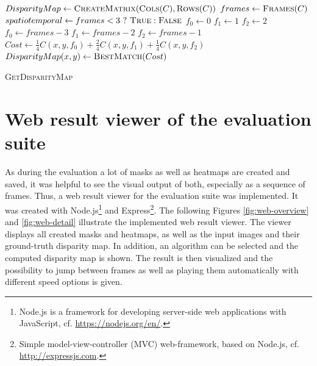 \begin{algorithm}[h!]
\DontPrintSemicolon
{}
$DisparityMap \gets \textsc{CreateMatrix}(\textsc{Cols}(C),\textsc{Rows}(C))$\;
$frames \gets \textsc{Frames}(C)$\;
$spatiotemporal \gets frames < 3\ ?\ \textsc{True} : \textsc{False}$\;
 {
   {
     {
       {
         {
          $f_{0} \gets 0$\;
          $f_{1} \gets 1$\;
          $f_{2} \gets 2$\;
        }
         {
          $f_{0} \gets frames - 3$\;
          $f_{1} \gets frames - 2$\;
          $f_{2} \gets frames - 1$\;
        }
         {
          $Cost \gets \frac{1}{4} C(x,y,f_0) + \frac{2}{4} C(x,y,f_1)+ \frac{1}{4} C(x,y,f_2)$\;
        }
        $DisparityMap(x,y) \gets \textsc{BestMatch}(Cost)$\;
      }
    }
  }
}
\;
\caption{\textsc{GetDisparityMap}}
\label{alg:disparity-map}
\end{algorithm}

\newpage

\section{Web result viewer of the evaluation suite}

As during the evaluation a lot of masks as well as heatmaps are created and saved, it was helpful to see the visual output of both, especially as a sequence of frames.
Thus, a web result viewer for the evaluation suite was implemented.
It was created with Node.js\footnote{Node.js is a framework for developing server-side web applications with JavaScript, cf. \url{https://nodejs.org/en/}.} and Express\footnote{Simple model-view-controller (MVC) web-framework, based on Node.js, cf. \url{http://expressjs.com}.}.
\newline\newline\noindent The following Figures \ref{fig:web-overview} and \ref{fig:web-detail} illustrate the implemented web result viewer.
The viewer displays all created masks and heatmaps, as well as the input images and their ground-truth disparity map.
In addition, an algorithm can be selected and the computed disparity map is shown.
The result is then visualized and the possibility to jump between frames as well as playing them automatically with different speed options is given.

